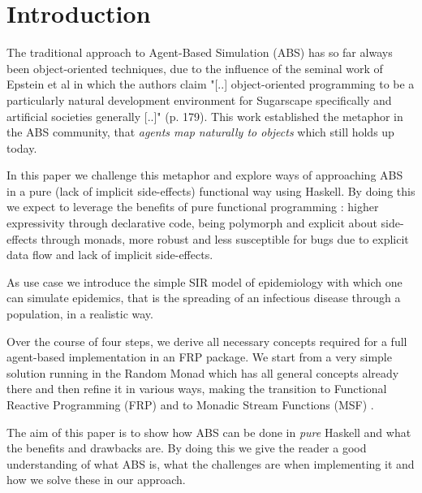 \section{Introduction}
The traditional approach to Agent-Based Simulation (ABS) has so far always been object-oriented techniques, due to the influence of the seminal work of Epstein et al \cite{epstein_growing_1996} in which the authors claim "[..] object-oriented programming to be a particularly natural development environment for Sugarscape specifically and artificial societies generally [..]" (p. 179). This work established the metaphor in the ABS community, that \textit{agents map naturally to objects} \cite{north_managing_2007} which still holds up today.

In this paper we challenge this metaphor and explore ways of approaching ABS in a pure (lack of implicit side-effects) functional way using Haskell. By doing this we expect to leverage the benefits of pure functional programming \cite{hudak_history_2007}: higher expressivity through declarative code, being polymorph and explicit about side-effects through monads, more robust and less susceptible for bugs due to explicit data flow and lack of implicit side-effects.

As use case we introduce the simple SIR model of epidemiology with which one can simulate epidemics, that is the spreading of an infectious disease through a population, in a realistic way.

Over the course of four steps, we derive all necessary concepts required for a full agent-based implementation in an FRP package. We start from a very simple solution running in the Random Monad which has all general concepts already there and then refine it in various ways, making the transition to Functional Reactive Programming (FRP) \cite{wan_functional_2000} and to Monadic Stream Functions (MSF) \cite{perez_functional_2016}.

The aim of this paper is to show how ABS can be done in \textit{pure} Haskell and what the benefits and drawbacks are. By doing this we give the reader a good understanding of what ABS is, what the challenges are when implementing it and how we solve these in our approach.

